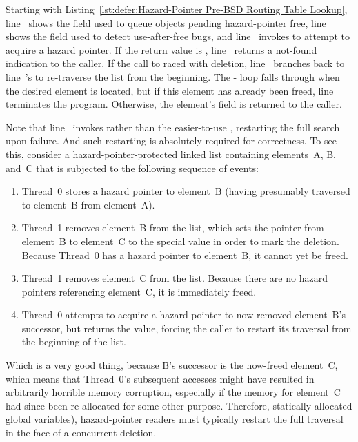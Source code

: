 \begin{lineref}
Starting with
Listing~\ref{lst:defer:Hazard-Pointer Pre-BSD Routing Table Lookup},
line~ shows the  field used to queue objects pending
hazard-pointer free,
line~ shows the  field used to detect
use-after-free bugs, and line~ invokes
 to attempt to acquire a hazard pointer.
If the return value is , line~ returns a not-found
indication to the caller.
If the call to  raced with deletion, line~
branches back to line~'s  to re-traverse the list
from the beginning.
The - loop falls through when the desired element is
located, but if this element has already been freed, line~
terminates the program.
Otherwise, the element's  field is returned to the caller.

Note that line~ invokes  rather
than the easier-to-use , restarting the full search
upon  failure.
And such restarting is absolutely required for correctness.  To see this,
consider a hazard-pointer-protected linked list containing elements~A,
B, and~C that is subjected to the following sequence of events:
\end{lineref}

\begin{enumerate}
\item	Thread~0 stores a hazard pointer to element~B
	(having presumably traversed to element~B from element~A).
\item	Thread~1 removes element~B from the list, which sets
	the pointer from element~B to element~C to the special
	 value in order to mark the deletion.
	Because Thread~0 has a hazard pointer to element~B,
	it cannot yet be freed.
\item	Thread~1 removes element~C from the list.
	Because there are no hazard pointers referencing element~C,
	it is immediately freed.
\item	Thread~0 attempts to acquire a hazard pointer to now-removed
	element~B's successor, but  returns the
	 value, forcing the caller to restart its
	traversal from the beginning of the list.
\end{enumerate}

Which is a very good thing, because B's successor is the now-freed
element~C, which means that Thread~0's subsequent accesses might have
resulted in arbitrarily horrible memory corruption, especially if the
memory for element~C had since been re-allocated for some other purpose.
Therefore, statically allocated global variables), hazard-pointer
readers must typically restart the full traversal in the face of a
concurrent deletion.

